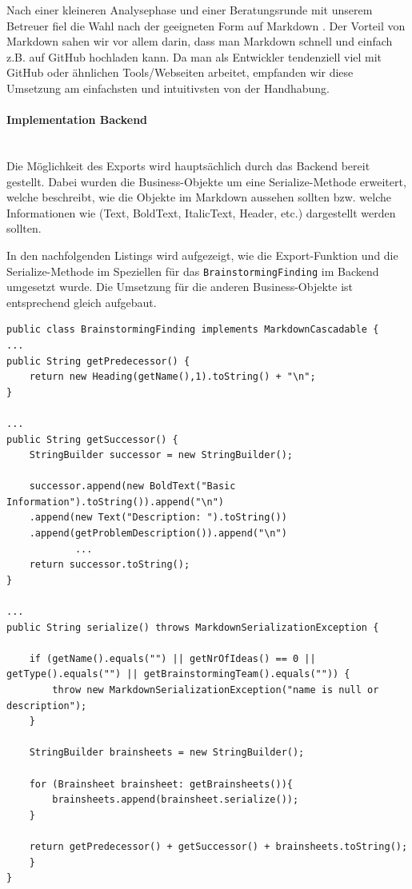 Nach einer kleineren Analysephase und einer Beratungsrunde mit unserem Betreuer fiel die Wahl nach der geeigneten Form auf Markdown \cite{markdown}. Der Vorteil von Markdown sahen wir vor allem darin, dass man Markdown schnell und einfach z.B. auf GitHub hochladen kann. Da man als Entwickler tendenziell viel mit GitHub oder ähnlichen Tools/Webseiten arbeitet, empfanden wir diese Umsetzung am  einfachsten und intuitivsten von der Handhabung.

\paragraph*{Implementation Backend}~\\
Die Möglichkeit des Exports wird hauptsächlich durch das Backend bereit gestellt. Dabei wurden die Business-Objekte um eine Serialize-Methode erweitert, welche beschreibt, wie die Objekte im Markdown aussehen sollten bzw. welche Informationen wie (Text, BoldText, ItalicText, Header, etc.) dargestellt werden sollten. 

In den nachfolgenden Listings wird aufgezeigt, wie die Export-Funktion und die Serialize-Methode im Speziellen für das \texttt{BrainstormingFinding} im Backend umgesetzt wurde. Die Umsetzung für die anderen Business-Objekte ist entsprechend gleich aufgebaut. 

\begin{lstlisting}[caption={Serialize-Methode von BrainstormingFinding}, label=markdownBrainstormingFinding]
public class BrainstormingFinding implements MarkdownCascadable {
...
public String getPredecessor() {
    return new Heading(getName(),1).toString() + "\n";
}

...
public String getSuccessor() {
    StringBuilder successor = new StringBuilder();

    successor.append(new BoldText("Basic Information").toString()).append("\n")
    .append(new Text("Description: ").toString())
    .append(getProblemDescription()).append("\n")
            ...
    return successor.toString();
}

...
public String serialize() throws MarkdownSerializationException {

    if (getName().equals("") || getNrOfIdeas() == 0 || getType().equals("") || getBrainstormingTeam().equals("")) {
        throw new MarkdownSerializationException("name is null or description");
    }

    StringBuilder brainsheets = new StringBuilder();

    for (Brainsheet brainsheet: getBrainsheets()){
        brainsheets.append(brainsheet.serialize());
    }
    
    return getPredecessor() + getSuccessor() + brainsheets.toString();
	}
}

\end{lstlisting}

